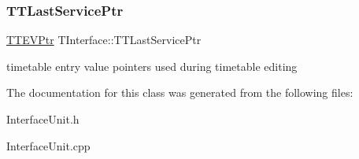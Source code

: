 \subsubsection{\texorpdfstring{T\+T\+Last\+Service\+Ptr}{TTLastServicePtr}}
{\footnotesize\ttfamily \mbox{\hyperlink{class_t_interface_abea77d791c25726e7711356bbc902534}{T\+T\+E\+V\+Ptr}} T\+Interface\+::\+T\+T\+Last\+Service\+Ptr\hspace{0.3cm}{\ttfamily [private]}}

timetable entry value pointers used during timetable editing 

The documentation for this class was generated from the following files\+:\begin{DoxyCompactItemize}
\item 
Interface\+Unit.\+h\item 
Interface\+Unit.\+cpp\end{DoxyCompactItemize}
